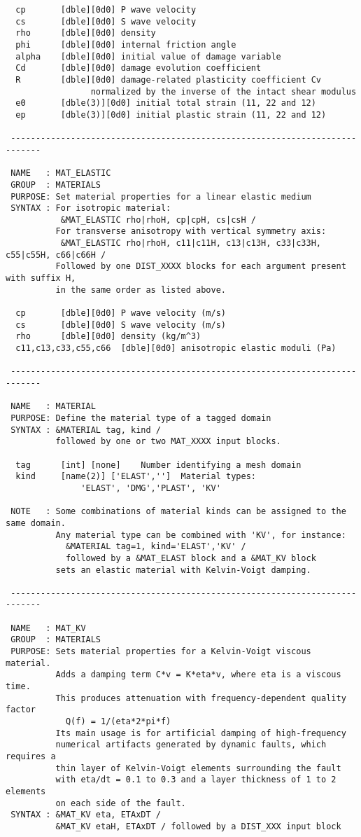 \begin{verbatim}
  cp       [dble][0d0] P wave velocity
  cs       [dble][0d0] S wave velocity
  rho      [dble][0d0] density
  phi      [dble][0d0] internal friction angle
  alpha    [dble][0d0] initial value of damage variable
  Cd       [dble][0d0] damage evolution coefficient
  R        [dble][0d0] damage-related plasticity coefficient Cv
                 normalized by the inverse of the intact shear modulus
  e0       [dble(3)][0d0] initial total strain (11, 22 and 12)
  ep       [dble(3)][0d0] initial plastic strain (11, 22 and 12)

 ----------------------------------------------------------------------------

 NAME   : MAT_ELASTIC
 GROUP  : MATERIALS
 PURPOSE: Set material properties for a linear elastic medium
 SYNTAX : For isotropic material:
           &MAT_ELASTIC rho|rhoH, cp|cpH, cs|csH /
          For transverse anisotropy with vertical symmetry axis:
           &MAT_ELASTIC rho|rhoH, c11|c11H, c13|c13H, c33|c33H, c55|c55H, c66|c66H /
          Followed by one DIST_XXXX blocks for each argument present with suffix H,
          in the same order as listed above.

  cp       [dble][0d0] P wave velocity (m/s)
  cs       [dble][0d0] S wave velocity (m/s)
  rho      [dble][0d0] density (kg/m^3)
  c11,c13,c33,c55,c66  [dble][0d0] anisotropic elastic moduli (Pa)

 ----------------------------------------------------------------------------

 NAME   : MATERIAL
 PURPOSE: Define the material type of a tagged domain
 SYNTAX : &MATERIAL tag, kind /
          followed by one or two MAT_XXXX input blocks.

  tag      [int] [none]    Number identifying a mesh domain 
  kind     [name(2)] ['ELAST','']  Material types:
               'ELAST', 'DMG','PLAST', 'KV' 

 NOTE   : Some combinations of material kinds can be assigned to the same domain.
          Any material type can be combined with 'KV', for instance:
            &MATERIAL tag=1, kind='ELAST','KV' /
            followed by a &MAT_ELAST block and a &MAT_KV block
          sets an elastic material with Kelvin-Voigt damping. 

 ----------------------------------------------------------------------------

 NAME   : MAT_KV
 GROUP  : MATERIALS
 PURPOSE: Sets material properties for a Kelvin-Voigt viscous material.
          Adds a damping term C*v = K*eta*v, where eta is a viscous time.
          This produces attenuation with frequency-dependent quality factor
            Q(f) = 1/(eta*2*pi*f)
          Its main usage is for artificial damping of high-frequency 
          numerical artifacts generated by dynamic faults, which requires a
          thin layer of Kelvin-Voigt elements surrounding the fault
          with eta/dt = 0.1 to 0.3 and a layer thickness of 1 to 2 elements
          on each side of the fault.
 SYNTAX : &MAT_KV eta, ETAxDT /
          &MAT_KV etaH, ETAxDT / followed by a DIST_XXX input block


\end{verbatim}
